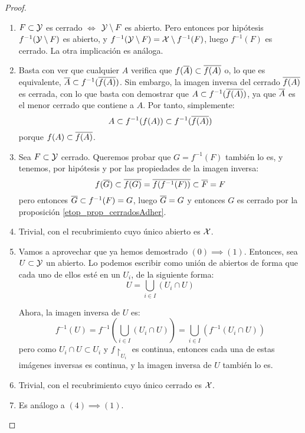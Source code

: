 \begin{prop}
\begin{proof}
\begin{enumerate}[align=left, leftmargin=*]
			\item[\fbox{$(1)\Longleftrightarrow (2)$}] $F\subset\mathcal{Y}$ es cerrado $\iff$ $\mathcal{Y}\setminus F$ es abierto. Pero entonces por hipótesis $f^{-1}(\mathcal{Y}\setminus F)$ es abierto, y $f^{-1}(\mathcal{Y}\setminus F)=\mathcal{X}\setminus f^{-1}(F)$, luego $f^{-1}(F)$ es cerrado. La otra implicación es análoga.
			
			\item[\fbox{$(2)\implies (3)$}] Basta con ver que cualquier $A$ verifica que $f(\overline{A})\subset \overline{f(A)}$ o, lo que es equivalente, $\overline{A}\subset f^{-1}(\overline{f(A)})$. Sin embargo, la imagen inversa del cerrado $\overline{f(A)}$ es cerrada, con lo que basta con demostrar que $A\subset f^{-1}(\overline{f(A)})$, ya que $\overline{A}$ es el menor cerrado que contiene a $A$. Por tanto, simplemente:
			\[A\subset f^{-1}(f(A))\subset f^{-1}(\overline{f(A)})\]
			porque $f(A)\subset\overline{f(A)}$.
			
			\item[\fbox{$(3)\implies (2)$}] Sea $F\subset\mathcal{Y}$ cerrado. Queremos probar que $G=f^{-1}(F)$ también lo es, y tenemos, por hipótesis y por las propiedades de la imagen inversa:
			\[f(\overline{G})\subset\overline{f(G)}=\overline{f(f^{-1}(F))}\subset\overline{F}=F\]
			pero entonces $\overline{G}\subset f^{-1}(F)=G$, luego $\overline{G}=G$ y entonces $G$ es cerrado por la proposición \ref{etop_prop_cerradosAdher}.
						
			\item[\fbox{$(0)\implies (4)$}] Trivial, con el recubrimiento cuyo único abierto es $\mathcal{X}$.
			
			\item[\fbox{$(4)\implies (1)$}] Vamos a aprovechar que ya hemos demostrado $(0)\implies (1)$. Entonces, sea $U\subset\mathcal{Y}$ un abierto. Lo podemos escribir como unión de abiertos de forma que cada uno de ellos esté en un $U_i$, de la siguiente forma:
			\[U=\bigcup\limits_{i\in I} (U_i\cap U)\]
			
			Ahora, la imagen inversa de $U$ es:
			\[f^{-1}(U)=f^{-1}\left(\bigcup\limits_{i\in I} (U_i\cap U)\right)=\bigcup\limits_{i\in I} (f^{-1}(U_i\cap U))\]
			pero como $U_i\cap U\subset U_i$ y $f\restriction_{U_i}$ es continua, entonces cada una de estas imágenes inversas es continua, y la imagen inversa de $U$ también lo es.
			
			\item[\fbox{$(0)\implies (5)$}] Trivial, con el recubrimiento cuyo único cerrado es $\mathcal{X}$.
			
			\item[\fbox{$(5)\implies (2)$}] Es análogo a $(4)\implies (1)$. \qedhere
		\end{enumerate}
	\end{proof}
\end{prop}

